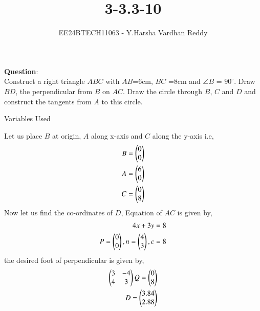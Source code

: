 \documentclass[journal]{IEEEtran}
\begin{document}

\vspace{3cm}

\title{3-3.3-10}
\author{EE24BTECH11063 - Y.Harsha Vardhan Reddy
}
{\let\newpage\relax\maketitle}

\renewcommand{\thefigure}{\theenumi}
\renewcommand{\thetable}{\theenumi}
\setlength{\intextsep}{10pt} %


\renewcommand{\thetable}{\theenumi}
\textbf{Question}:\\
Construct a right triangle $ABC$ with $AB$=6cm, $BC$ =8cm and $\angle{B}$ = $90^{\circ}$. Draw $BD$, the perpendicular from $B$ on $AC$. Draw the circle through $B$, $C$ and $D$ and construct the tangents from $A$ to this circle.
\\
\solution
\begin{table}[h!]    
  \centering
  
  \caption{Variables Used}
  \label{tab1-1.2-20}
\end{table}
Let us place $B$ at origin, $A$ along x-axis and $C$ along the y-axis i.e, 
\begin{align}
B = \begin{pmatrix}0\\0\end{pmatrix} \\
A = \begin{pmatrix}6\\0\end{pmatrix} \\
C = \begin{pmatrix}0\\8\end{pmatrix}
\end{align}
Now let us find the co-ordinates of $D$,
Equation of $AC$ is given by,
\begin{align}
4x+3y=8\\
    P=\begin{pmatrix}0\\0\end{pmatrix},n=\begin{pmatrix}4\\3\end{pmatrix},c=8\\
\end{align}
the desired foot of perpendicular is given by,
\begin{align}
    \begin{pmatrix}3&-4\\4&3\end{pmatrix}Q=\begin{pmatrix}0\\8\end{pmatrix}\\
    D=\begin{pmatrix}3.84\\2.88\end{pmatrix}
\end{align}
\end{document}
